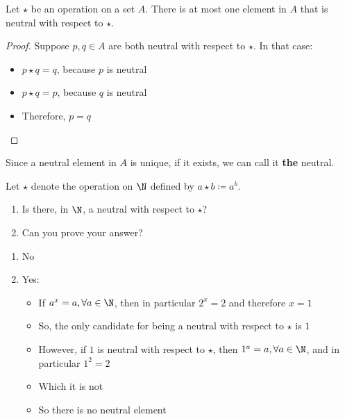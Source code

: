 \begin{theorem}\label{thm:uniqueness-neutral}
    Let $\star$ be an operation on a set $A$. There is at most one element in $A$ that is neutral with respect to $\star$.
\end{theorem}

\begin{proof}
    Suppose $p, q \in A$ are both neutral with respect to $\star$. In that case:
    \begin{itemize}
        \item $p \star q = q$, because $p$ is neutral
        \item $p \star q = p$, because $q$ is neutral
        \item Therefore, $p = q$
    \end{itemize}
\end{proof}

\begin{note}
    Since a neutral element in $A$ is unique, if it exists, we can call it \textbf{the} neutral.
\end{note}

\begin{problem*}[Exercise]
    Let $\star$ denote the operation on $\N$ defined by $a \star b \coloneqq a^b$.
    \begin{enumerate}[label=(\roman*)]
        \item Is there, in $\N$, a neutral with respect to $\star$?
        \item Can you prove your answer?
    \end{enumerate}
\end{problem*}

\begin{answer}
    \begin{enumerate}[label=(\roman*)]
        \item No
        \item Yes:
        \begin{itemize}
            \item If $a^x = a, \forall a \in \N$, then in particular $2^x = 2$ and therefore $x = 1$
            \item So, the only candidate for being a neutral with respect to $\star$ is $1$
            \item However, if $1$ is neutral with respect to $\star$, then $1^a = a, \forall a \in \N$, and in particular $1^2 = 2$
            \item Which it is not
            \item So there is no neutral element
        \end{itemize}
    \end{enumerate}
\end{answer}

